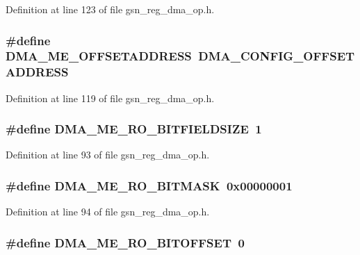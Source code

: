 Definition at line 123 of file gsn\_\-reg\_\-dma\_\-op.h.

\hypertarget{a00547_a7af40d196784d21fc22c5e8f1c9f471e}{
\subsubsection[{DMA\_\-ME\_\-OFFSETADDRESS}]{\setlength{\rightskip}{0pt plus 5cm}\#define DMA\_\-ME\_\-OFFSETADDRESS~DMA\_\-CONFIG\_\-OFFSETADDRESS}}
\label{a00547_a7af40d196784d21fc22c5e8f1c9f471e}


Definition at line 119 of file gsn\_\-reg\_\-dma\_\-op.h.

\hypertarget{a00547_ab191598835ef6e704ce74741f59ef514}{
\subsubsection[{DMA\_\-ME\_\-RO\_\-BITFIELDSIZE}]{\setlength{\rightskip}{0pt plus 5cm}\#define DMA\_\-ME\_\-RO\_\-BITFIELDSIZE~1}}
\label{a00547_ab191598835ef6e704ce74741f59ef514}


Definition at line 93 of file gsn\_\-reg\_\-dma\_\-op.h.

\hypertarget{a00547_a259092933e96607ce026d7e333d1f03d}{
\subsubsection[{DMA\_\-ME\_\-RO\_\-BITMASK}]{\setlength{\rightskip}{0pt plus 5cm}\#define DMA\_\-ME\_\-RO\_\-BITMASK~0x00000001}}
\label{a00547_a259092933e96607ce026d7e333d1f03d}


Definition at line 94 of file gsn\_\-reg\_\-dma\_\-op.h.

\hypertarget{a00547_aa9fdcb43a5bb459dc7c50fc9efe07104}{
\subsubsection[{DMA\_\-ME\_\-RO\_\-BITOFFSET}]{\setlength{\rightskip}{0pt plus 5cm}\#define DMA\_\-ME\_\-RO\_\-BITOFFSET~0}}
\label{a00547_aa9fdcb43a5bb459dc7c50fc9efe07104}


